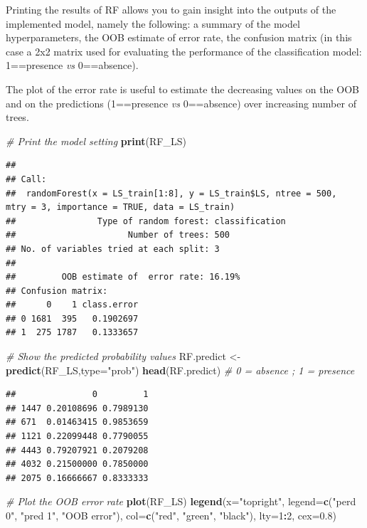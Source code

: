 \documentclass[
]{article}
\newenvironment{Shaded}{\begin{snugshade}}{\end{snugshade}}
\newcommand{\AttributeTok}[1]{\textcolor[rgb]{0.13,0.29,0.53}{#1}}
\newcommand{\CommentTok}[1]{\textcolor[rgb]{0.56,0.35,0.01}{\textit{#1}}}
\newcommand{\DecValTok}[1]{\textcolor[rgb]{0.00,0.00,0.81}{#1}}
\newcommand{\FloatTok}[1]{\textcolor[rgb]{0.00,0.00,0.81}{#1}}
\newcommand{\FunctionTok}[1]{\textcolor[rgb]{0.13,0.29,0.53}{\textbf{#1}}}
\newcommand{\NormalTok}[1]{#1}
\newcommand{\OtherTok}[1]{\textcolor[rgb]{0.56,0.35,0.01}{#1}}
\newcommand{\SpecialCharTok}[1]{\textcolor[rgb]{0.81,0.36,0.00}{\textbf{#1}}}
\newcommand{\StringTok}[1]{\textcolor[rgb]{0.31,0.60,0.02}{#1}}
\begin{document}
Printing the results of RF allows you to gain insight into the outputs of the implemented model, namely the following: a summary of the model hyperparameters, the OOB estimate of error rate, the confusion matrix (in this case a 2x2 matrix used for evaluating the performance of the classification model: 1==presence \emph{vs} 0==absence).

The plot of the error rate is useful to estimate the decreasing values on the OOB and on the predictions (1==presence \emph{vs} 0==absence) over increasing number of trees.

\begin{Shaded}
\begin{Highlighting}[]
\CommentTok{\# Print the model setting}
\FunctionTok{print}\NormalTok{(RF\_LS) }
\end{Highlighting}
\end{Shaded}

\begin{verbatim}
## 
## Call:
##  randomForest(x = LS_train[1:8], y = LS_train$LS, ntree = 500,      mtry = 3, importance = TRUE, data = LS_train) 
##                Type of random forest: classification
##                      Number of trees: 500
## No. of variables tried at each split: 3
## 
##         OOB estimate of  error rate: 16.19%
## Confusion matrix:
##      0    1 class.error
## 0 1681  395   0.1902697
## 1  275 1787   0.1333657
\end{verbatim}

\begin{Shaded}
\begin{Highlighting}[]
\CommentTok{\# Show the predicted probability values}
\NormalTok{RF.predict }\OtherTok{\textless{}{-}} \FunctionTok{predict}\NormalTok{(RF\_LS,}\AttributeTok{type=}\StringTok{"prob"}\NormalTok{)}
\FunctionTok{head}\NormalTok{(RF.predict) }\CommentTok{\# 0 = absence ; 1 = presence}
\end{Highlighting}
\end{Shaded}

\begin{verbatim}
##               0         1
## 1447 0.20108696 0.7989130
## 671  0.01463415 0.9853659
## 1121 0.22099448 0.7790055
## 4443 0.79207921 0.2079208
## 4032 0.21500000 0.7850000
## 2075 0.16666667 0.8333333
\end{verbatim}

\begin{Shaded}
\begin{Highlighting}[]
\CommentTok{\# Plot the OOB error rate}
\FunctionTok{plot}\NormalTok{(RF\_LS)  }
\FunctionTok{legend}\NormalTok{(}\AttributeTok{x=}\StringTok{"topright"}\NormalTok{, }\AttributeTok{legend=}\FunctionTok{c}\NormalTok{(}\StringTok{"perd 0"}\NormalTok{, }\StringTok{"pred 1"}\NormalTok{, }\StringTok{"OOB error"}\NormalTok{), }
 \AttributeTok{col=}\FunctionTok{c}\NormalTok{(}\StringTok{"red"}\NormalTok{, }\StringTok{"green"}\NormalTok{, }\StringTok{"black"}\NormalTok{), }\AttributeTok{lty=}\DecValTok{1}\SpecialCharTok{:}\DecValTok{2}\NormalTok{, }\AttributeTok{cex=}\FloatTok{0.8}\NormalTok{)}
\end{Highlighting}
\end{Shaded}
\end{document}
